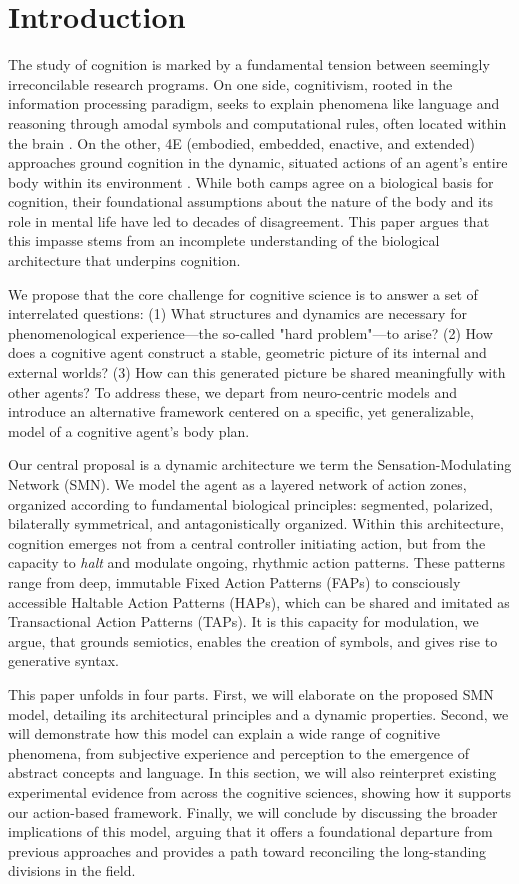 \section{Introduction}
The study of cognition is marked by a fundamental tension between seemingly irreconcilable research programs. On one side, cognitivism, rooted in the information processing paradigm, seeks to explain phenomena like language and reasoning through amodal symbols and computational rules, often located within the brain \cite{chomsky1965aspects, fodor_modularity_1983}. On the other, 4E (embodied, embedded, enactive, and extended) approaches ground cognition in the dynamic, situated actions of an agent's entire body within its environment \cite{varela, noe_action_2004}. While both camps agree on a biological basis for cognition, their foundational assumptions about the nature of the body and its role in mental life have led to decades of disagreement. This paper argues that this impasse stems from an incomplete understanding of the biological architecture that underpins cognition.

We propose that the core challenge for cognitive science is to answer a set of interrelated questions: (1) What structures and dynamics are necessary for phenomenological experience—the so-called "hard problem"—to arise? (2) How does a cognitive agent construct a stable, geometric picture of its internal and external worlds? (3) How can this generated picture be shared meaningfully with other agents? To address these, we depart from neuro-centric models and introduce an alternative framework centered on a specific, yet generalizable, model of a cognitive agent's body plan.

Our central proposal is a dynamic architecture we term the Sensation-Modulating Network (SMN). We model the agent as a layered network of action zones, organized according to fundamental biological principles: segmented, polarized, bilaterally symmetrical, and antagonistically organized. Within this architecture, cognition emerges not from a central controller initiating action, but from the capacity to \textit{halt} and modulate ongoing, rhythmic action patterns. These patterns range from deep, immutable Fixed Action Patterns (FAPs) to consciously accessible Haltable Action Patterns (HAPs), which can be shared and imitated as Transactional Action Patterns (TAPs). It is this capacity for modulation, we argue, that grounds semiotics, enables the creation of symbols, and gives rise to generative syntax.

This paper unfolds in four parts. First, we will elaborate on the proposed SMN model, detailing its architectural principles and a dynamic properties. Second, we will demonstrate how this model can explain a wide range of cognitive phenomena, from subjective experience and perception to the emergence of abstract concepts and language. In this section, we will also reinterpret existing experimental evidence from across the cognitive sciences, showing how it supports our action-based framework. Finally, we will conclude by discussing the broader implications of this model, arguing that it offers a foundational departure from previous approaches and provides a path toward reconciling the long-standing divisions in the field.
